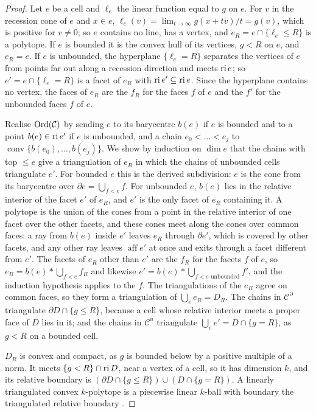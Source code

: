 \begin{proof}
Let $e$ be a cell and $\ell_e$ the linear function equal to $g$ on $e$. For $v$ in the recession cone of $e$ and $x\in e$,
$\ell_e(v)=\lim_{t\to\infty}g(x+tv)/t=g(v)$, which is positive for $v\ne0$; so $e$ contains no line, has a vertex, and
$e_R=e\cap\{\ell_e\le R\}$ is a polytope. If $e$ is bounded it is the convex hull of its vertices, $g<R$ on $e$, and
$e_R=e$. If $e$ is unbounded, the hyperplane $\{\ell_e=R\}$ separates the vertices of $e$ from points far out along a
recession direction and meets $\operatorname{ri} e$; so $e'=e\cap\{\ell_e=R\}$ is a facet of $e_R$ with $\operatorname{ri} e'\subseteq\operatorname{ri} e$.
Since the hyperplane contains no vertex, the faces of $e_R$ are the $f_R$ for the faces $f$ of $e$ and the $f'$ for the
unbounded faces $f$ of $e$.

Realise $\operatorname{Ord}(\mathcal C)$ by sending $e$ to its barycentre $b(e)$ if $e$ is bounded and to a point $b(e)\in\operatorname{ri} e'$ if
$e$ is unbounded, and a chain $e_0<\dots<e_j$ to $\operatorname{conv}\{b(e_0),\dots,b(e_j)\}$. We show by induction on
$\dim e$ that the chains with top $\le e$ give a triangulation of $e_R$ in which the chains of unbounded cells triangulate
$e'$. For bounded $e$ this is the derived subdivision: $e$ is the cone from its barycentre over $\partial e=\bigcup_{f<e}f$.
For unbounded $e$, $b(e)$ lies in the relative interior of the facet $e'$ of $e_R$, and $e'$ is the only facet of $e_R$
containing it. A polytope is the union of the cones from a point in the relative interior of one facet over the other
facets, and these cones meet along the cones over common faces: a ray from $b(e)$ inside $e'$ leaves $e_R$ through
$\partial e'$, which is covered by other facets, and any other ray leaves $\operatorname{aff}e'$ at once and exits through
a facet different from $e'$. The facets of $e_R$ other than $e'$ are the $f_R$ for the facets $f$ of $e$, so
$e_R=b(e)*\bigcup_{f<e}f_R$ and likewise $e'=b(e)*\bigcup_{f<e\text{ unbounded}}f'$, and the induction hypothesis applies
to the $f$. The triangulations of the $e_R$ agree on common faces, so they form a triangulation of $\bigcup_ee_R=D_R$. The
chains in $\mathcal C^\partial$ triangulate $\partial D\cap\{g\le R\}$, because a cell whose relative interior meets a
proper face of $D$ lies in it; and the chains in $\mathcal C^u$ triangulate $\bigcup_ee'=D\cap\{g=R\}$, as $g<R$ on a bounded cell.

$D_R$ is convex and compact, as $g$ is bounded below by a positive multiple of a norm. It meets $\{g<R\}\cap\operatorname{ri} D$, near
a vertex of a cell, so it has dimension $k$, and its relative boundary is $(\partial D\cap\{g\le R\})\cup(D\cap\{g=R\})$.
A linearly triangulated convex $k$-polytope is a piecewise linear $k$-ball with boundary the triangulated relative boundary
\cite[Ch.~1--2]{RS}.
\end{proof}

